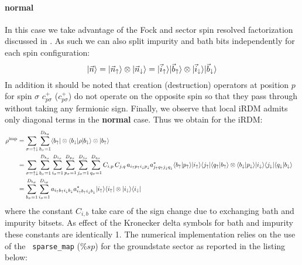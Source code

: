 \documentclass[edipack2.tex]{subfiles}
\begin{document}
\paragraph{{\bf normal}}
In this case we take advantage of the Fock and sector spin resolved
factorization discussed in . As such we can also split
impurity and bath bits independently for each spin configuration:
$$
|\vec{n}\rangle =
|\vec{n}_\uparrow\rangle\otimes |\vec{n}_\downarrow\rangle =
|\vec{i}_\uparrow\rangle|\vec{b}_\uparrow\rangle\otimes |\vec{i}_\downarrow\rangle|\vec{b}_\downarrow\rangle
$$
In addition it should be noted that creation (destruction) operators at
position $p$ for spin $\sigma$  $c^+_{p\sigma}$ ($c^+_{p\sigma}$) do
not operate on the opposite spin so that they pass through without
taking any fermionic sign. Finally, we observe that local iRDM admits
only diagonal terms in the {\bf normal} case. Thus we obtain for the iRDM:
\begin{equation}
  \label{iRDMnormal}
  \begin{aligned}
  \rho^\mathrm{imp} &=
  \sum_{\sigma=\uparrow\downarrow}\sum_{b_\sigma=1}^{D_{b_\sigma}}
  \langle b_\uparrow|\otimes\langle b_\downarrow|
    \rho
    |b_\downarrow\rangle\otimes|b_\uparrow\rangle    \cr
    &=\sum_{\sigma=\uparrow\downarrow}
    \sum_{b_\sigma=1}^{D_{b_\sigma}}
    \sum_{i_\sigma=1}^{D_{i_\sigma}}
    \sum_{p_\sigma=1}^{D_{p_\sigma}}
    \sum_{j_\sigma=1}^{D_{j_\sigma}} 
    \sum_{q_\sigma=1}^{D_{q_\sigma}}
    C_{i,p}\,C_{j,q}\,a_{i_\uparrow p_\uparrow i_\downarrow p_\downarrow} a^*_{j_\uparrow q_\uparrow j_\downarrow q_\downarrow}
    \langle b_\uparrow| p_\uparrow\rangle| i_\uparrow\rangle\langle j_\uparrow |\langle q_\uparrow| b_\uparrow\rangle   \otimes \langle b_\downarrow| p_\downarrow \rangle|i_\downarrow\rangle \langle j_\downarrow  |\langle q_\downarrow| b_\downarrow\rangle
    \cr
&=
    \sum_{b_\sigma=1}^{D_{b_\sigma}}
    \sum_{i_\sigma=1}^{D_{i_\sigma}}
    a_{i_\uparrow b_\uparrow i_\downarrow b_\downarrow} a^*_{i_\uparrow b_\uparrow i_\downarrow b_\downarrow}
    |i_\uparrow\rangle\langle i_\uparrow|\otimes |i_\downarrow\rangle\langle i_\downarrow|
  \end{aligned}
\end{equation}
where the constant $C_{i,b}$ take care of the sign change due to
exchanging bath and impurity bitsets. As effect of the Kronecker
delta symbols for bath and impurity these constants are identically 1.  
The numerical implementation relies on the use of the {\tt
  sparse\_map} ($\%sp$) for the groundstate sector as reported in the
listing below:  
\end{document}
